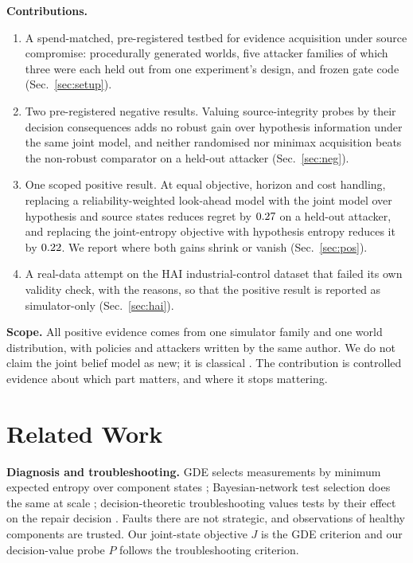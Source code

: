 \documentclass[conference]{IEEEtran}
\begin{document}
\textbf{Contributions.}
\begin{enumerate}
\item A spend-matched, pre-registered testbed for evidence acquisition under source compromise: procedurally generated
worlds, five attacker families of which three were each held out from one experiment's design, and frozen gate code
(Sec.~\ref{sec:setup}).
\item Two pre-registered negative results. Valuing source-integrity probes by their decision consequences adds no
robust gain over hypothesis information under the same joint model, and neither randomised nor minimax acquisition
beats the non-robust comparator on a held-out attacker (Sec.~\ref{sec:neg}).
\item One scoped positive result. At equal objective, horizon and cost handling, replacing a reliability-weighted
look-ahead model with the joint model over hypothesis and source states reduces regret by $0.27$ on a held-out
attacker, and replacing the joint-entropy objective with hypothesis entropy reduces it by $0.22$. We report where
both gains shrink or vanish (Sec.~\ref{sec:pos}).
\item A real-data attempt on the HAI industrial-control dataset that failed its own validity check, with the reasons, so
that the positive result is reported as simulator-only (Sec.~\ref{sec:hai}).
\end{enumerate}

\textbf{Scope.} All positive evidence comes from one simulator family and one world distribution, with policies and
attackers written by the same author. We do not claim the joint belief model as new; it is classical
\cite{dekleer1987,heckerman1995,soltanmohammadi2012}. The contribution is controlled evidence about which part
matters, and where it stops mattering.

\section{Related Work}

\textbf{Diagnosis and troubleshooting.} GDE selects measurements by minimum expected entropy over component states
\cite{dekleer1987}; Bayesian-network test selection does the same at scale \cite{zheng2005}; decision-theoretic
troubleshooting values tests by their effect on the repair decision \cite{heckerman1995}. Faults there are not
strategic, and observations of healthy components are trusted. Our joint-state objective $J$ is the GDE criterion and
our decision-value probe $P$ follows the troubleshooting criterion.
\end{document}
